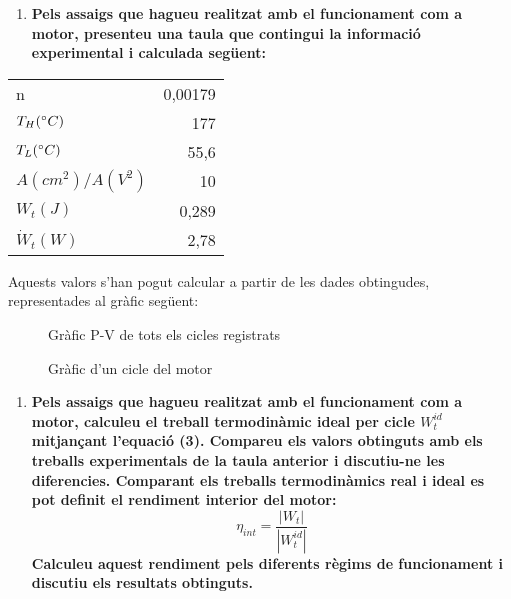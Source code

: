 \documentclass[a4paper]{article}
\begin{document}
\begin{enumerate}
	\item \textbf{Pels assaigs que hagueu realitzat amb el funcionament com a motor, presenteu una taula que contingui la informació experimental i calculada següent:}
\end{enumerate}
\begin{table}[H]
	\centering
	\begin{tabular}{l|r}
		n &  0,00179 \\ 
		$T_H (\degree C)$ & 177 \\  
		$T_L (\degree C)$ & 55,6\\ 
		$A(cm^2)/A(V^2)$ & 10 \\ 
		$W_t(J)$ & 0,289 \\ 
		$\dot{W}_t (W)$ & 2,78 \\
	\end{tabular}
\end{table}

Aquests valors s'han pogut calcular a partir de les dades obtingudes, representades al gràfic següent:

\begin{figure}[H]
	\centering
	\caption{Gràfic P-V de tots els cicles registrats}
\end{figure}

\begin{figure}[H]
	\centering
	\caption{Gràfic d'un cicle del motor}
\end{figure}

\begin{enumerate}[resume]
	\item \textbf{Pels assaigs que hagueu realitzat amb el funcionament com a motor, calculeu el treball termodinàmic ideal per cicle $W_t^{id}$ mitjançant l’equació (3). Compareu els valors obtinguts amb els treballs experimentals de la taula anterior i discutiu-ne les diferencies. Comparant els treballs termodinàmics real i ideal es pot definit el rendiment interior del motor:}
	$$
	\eta_{int} = \frac{|W_t|}{|W_t^{id}|}
	$$
	\textbf{Calculeu aquest rendiment pels diferents règims de funcionament i discutiu els resultats obtinguts.}
\end{enumerate}
\end{document}
